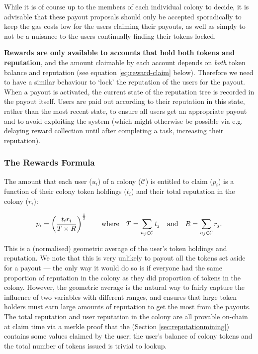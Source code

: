 While it is of course up to the members of each individual colony to decide, it is advisable that these payout proposals should only be accepted sporadically to keep the gas costs low for the users claiming their payouts, as well as simply to not be a nuisance to the users continually finding their tokens locked.

\textbf{Rewards are only available to accounts that hold both tokens and reputation}, and the amount claimable by each account depends on \emph{both} token balance and reputation (see equation \eqref{eq:reward-claim} below). Therefore we need to have a similar behaviour to `lock' the reputation of the users for the payout. When a payout is activated, the current state of the reputation tree is recorded in the payout itself. Users are paid out according to their reputation in this state, rather than the most recent state, to ensure all users get an appropriate payout and to avoid exploiting the system (which might otherwise be possible via e.g. delaying reward collection until after completing a task, increasing their reputation).

\subsubsection*{The Rewards Formula}
The amount that each user ($u_i$) of a colony ($\mathcal{C}$) is entitled to claim ($p_i$) is a function of their colony token holdings ($t_i$) and their total reputation in the colony ($r_i$):

\begin{equation}\label{eq:reward-claim}
 p_i = \left(\frac{t_i r_i}{T \times R}\right)^{\frac{1}{2}} \qquad \textnormal{where} \quad T = \sum\limits_{u_j\in \mathcal{C}} t_j \quad\textnormal{and}\quad R = \sum\limits_{u_j\in \mathcal{C}} r_j.
\end{equation}

This is a (normalised) geometric average of the user's token holdings and reputation. We note that this is very unlikely to payout all the tokens set aside for a payout --- the only way it would do so is if everyone had the same proportion of reputation in the colony as they did proportion of tokens in the colony. However, the geometric average is the natural way to fairly capture the influence of two variables with different ranges, and ensures that large token holders must earn large amounts of reputation to get the most from the payouts. The total reputation and user reputation in the colony are all provable on-chain at claim time via a merkle proof that the  (Section \ref{sec:reputationmining}) contains some values claimed by the user; the user's balance of colony tokens and the total number of tokens issued is trivial to lookup.

